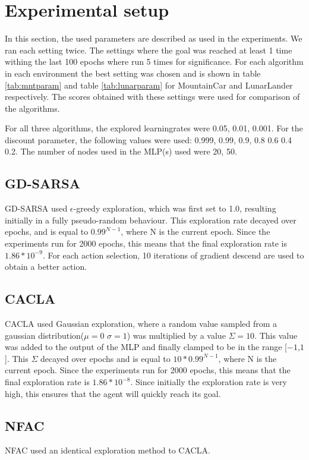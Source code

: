 
\section{Experimental setup}


In this section, the used parameters are described as used in the experiments. We ran each setting twice. The settings where the goal was reached at least 1 time withing the last 100 epochs where run 5 times for significance. For each algorithm in each environment the best setting was chosen and is shown in table \ref{tab:mntparam} and table \ref{tab:lunarparam} for MountainCar and LunarLander respectively. The scores obtained with these settings were used for comparison of the algorithms. 

For all three algorithms, the explored learningrates were 0.05, 0.01, 0.001. For the discount parameter, the following values were used: 0.999, 0.99, 0.9, 0.8 0.6 0.4 0.2. The number of nodes used in the MLP(s) used were 20, 50.

\subsection{GD-SARSA}
GD-SARSA used $\epsilon$-greedy exploration, which was first set to 1.0, resulting initially in a fully pseudo-random behaviour. This exploration rate decayed over epochs, and is equal to $0.99^{N-1}$, where N is the current epoch. Since the experiments run for 2000 epochs, this means that the final exploration rate is $1.86*10^{-9}$. For each action selection, 10 iterations of gradient descend are used to obtain a better action. 
\subsection{CACLA}
CACLA used Gaussian exploration, where a random value sampled from a gaussian distribution($\mu=0$ $\sigma=1$) was multiplied by a value $\Sigma=10$. This value was added to the output of the MLP and finally clamped to be in the range [$-1$,$1$]. This $\Sigma$ decayed over epochs and is equal to  $10 * 0.99^{N-1}$, where N is the current epoch. Since the experiments run for 2000 epochs, this means that the final exploration rate is $1.86*10^{-8}$. Since initially the exploration rate is very high, this ensures that the agent will quickly reach its goal. 
\subsection{NFAC}
NFAC used an identical exploration method to CACLA.

